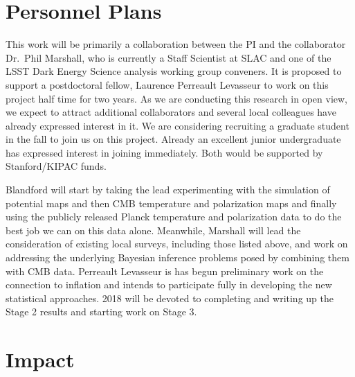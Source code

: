 \documentclass[psfig,12pt]{article}
\begin{document}
{\section{Personnel Plans}
\label{sec:personnel}

This work will be primarily a collaboration between the PI and the
collaborator Dr.\ Phil Marshall, who is currently a Staff Scientist at
SLAC and one of the LSST Dark Energy Science analysis working group
conveners. It is proposed to support a postdoctoral fellow, Laurence
Perreault Levasseur to work on this project half time for two years. As
we are conducting this research in open view, we expect to attract
additional collaborators and several local colleagues have already
expressed interest in it.
We are considering recruiting a graduate student in the fall to join us
on this project. Already an excellent junior undergraduate has expressed
interest in joining immediately. Both would be supported by
Stanford/KIPAC funds.


Blandford will start by taking the lead experimenting with the
simulation of potential maps and then CMB temperature and polarization
maps and finally using the publicly released Planck temperature and
polarization data to do the best job we can on this data alone.
Meanwhile, Marshall will lead the consideration of existing local
surveys, including those listed above, and work on addressing the
underlying Bayesian inference problems posed by combining them with CMB
data.  Perreault Levasseur is has begun preliminary work on the connection to
inflation and intends to participate fully in developing the new
statistical approaches.
2018 will be devoted to completing and writing up the Stage 2 results and starting work on Stage 3.



\section{Impact}
\label{sec:impact}

}
\end{document}
